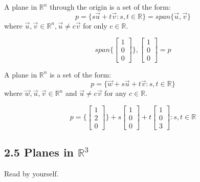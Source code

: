 \documentclass[11pt]{article}
\theoremstyle{plain}
\theoremstyle{remark}
\theoremstyle{plain}
\newcommand{\rn}{\mathbb{R}}
\begin{document}
\begin{tcolorbox}[colback=green!5!white,colframe=green!75!black,title= Definition]
    A plane in $\rn^n$ through the origin is a set of the form:
    \[p=\{s\overrightarrow{u}+t\overrightarrow{v}:s,t\in\rn\}=span\{\overrightarrow{u}, \overrightarrow{v}\}\]
    where $\overrightarrow{u}, \overrightarrow{v}\in\rn^n, \overrightarrow{u}\neq c\overrightarrow{v}$ for only $c\in\rn$.
\end{tcolorbox}   

\begin{tcolorbox}[colback=magenta!5!white,colframe=magenta!75!black,title= Example]
    \[span\{\begin{bmatrix}
        1\\0\\0
    \end{bmatrix}\}, \begin{bmatrix}
        1\\0\\0
    \end{bmatrix}=p\]
\end{tcolorbox}   

\begin{tcolorbox}[colback=green!5!white,colframe=green!75!black,title= Definition]
    A plane in $\rn^n$ is a set of the form:
    \[p=\{\overrightarrow{w}+s\overrightarrow{u}+t\overrightarrow{v}:s,t\in\rn\}\]
    where $\overrightarrow{w},\overrightarrow{u},\overrightarrow{v}\in\rn^n$ and $\overrightarrow{u}\neq c\overrightarrow{v}$ for any $c\in\rn$.
\end{tcolorbox} 

\begin{tcolorbox}[colback=magenta!5!white,colframe=magenta!75!black,title= Example]
    \[p=\{\begin{bmatrix}
        1\\2\\0
    \end{bmatrix}\}+s\begin{bmatrix}
        1\\0\\0
    \end{bmatrix}+t\begin{bmatrix}
        1\\0\\3
    \end{bmatrix}:s,t\in\rn\]
\end{tcolorbox}   

\subsection*{2.5 Planes in $\rn^3$}
Read by yourself.
\end{document}
